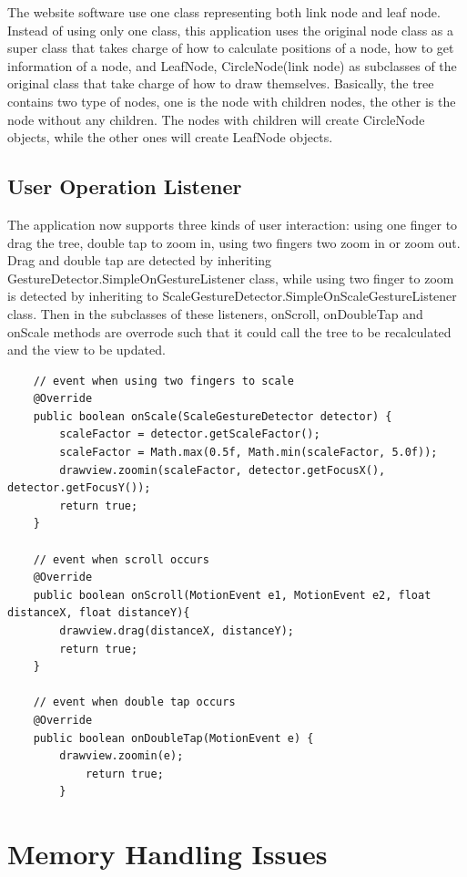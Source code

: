 \documentclass[MSc]{icldt}
\begin{document}
The website software use one class representing both link node and leaf node. Instead of using only one class, this application uses the original node class as a super class that takes charge of how to calculate positions of a node, how to get information of a node, and LeafNode, CircleNode(link node) as subclasses of the original class that take charge of how to draw themselves. Basically, the tree contains two type of nodes, one is the node with children nodes, the other is the node without any children. The nodes with children will create CircleNode objects, while the other ones will create LeafNode objects. 

\section{User Operation Listener}

The application now supports three kinds of user interaction: using one finger to drag the tree, double tap to zoom in, using two fingers two zoom in or zoom out. Drag and double tap are detected by inheriting GestureDetector.SimpleOnGestureListener class, while using two finger to zoom is detected by inheriting to ScaleGestureDetector.SimpleOnScaleGestureListener class. Then in the subclasses of these listeners, onScroll, onDoubleTap and onScale methods are overrode such that it could call the tree to be recalculated and the view to be updated. 

\begin{lstlisting}
	// event when using two fingers to scale
	@Override
	public boolean onScale(ScaleGestureDetector detector) {
		scaleFactor = detector.getScaleFactor();
		scaleFactor = Math.max(0.5f, Math.min(scaleFactor, 5.0f));
		drawview.zoomin(scaleFactor, detector.getFocusX(), detector.getFocusY());
		return true;
	}
	
	// event when scroll occurs
	@Override
	public boolean onScroll(MotionEvent e1, MotionEvent e2, float distanceX, float distanceY){
		drawview.drag(distanceX, distanceY);
		return true;
	}
	
	// event when double tap occurs    
	@Override
	public boolean onDoubleTap(MotionEvent e) {
		drawview.zoomin(e);
    		return true;
        }

\end{lstlisting}


\chapter{Memory Handling Issues}
\end{document}
